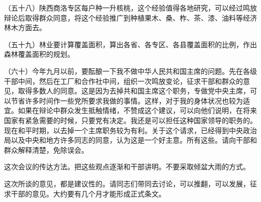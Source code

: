 （五十八）陕西商洛专区每户种一升核桃，这个经验值得各地研究，可以经过鸣放辩论后取得群众同意，将这个经验推广到种植果木、桑、柞、茶、漆、油料等经济林木方面去。

（五十九）林业要计算覆盖面积，算出各省、各专区、各县覆盖面积的比例，作出森林覆盖面积的规划。

（六十）今年九月以前，要酝酿一下我不做中华人民共和国主席的问题。先在各级干部中间，然后在工厂和合作社中间，组织一次鸣放变论，征求干部和群众的意见，取得多数人的同意。这是因为去掉共和国主席这个职务，专做党中央主席，可以节省许多时间作一些党所要求我做的事情。这样，对于我的身体状况也较为适宜。如果在辩论中群众发生抵触情绪，不赞成这个建议，可以向他们说明，在将来国家有紧急需要的时候，只要党有决定。我还是可以担任这种国家领导的职务的。现在和平时期，以去掉一个主席职务较为有利。关于这个请求，已经得到中央政治局以及中央和地方许多同志的同意，认为这是一个好主意。所有这些。请向干部和群众解释清楚，免除误会。

这次会议的传达方法。把这些观点逐渐和干部讲明。不要采取倾盆大雨的方式。

这次所谈的意见，都是建议性的。请同志们带同去讨论，可以推翻，可以发展，征求干部的意见。大约要有几个月才能形成正式条文。


